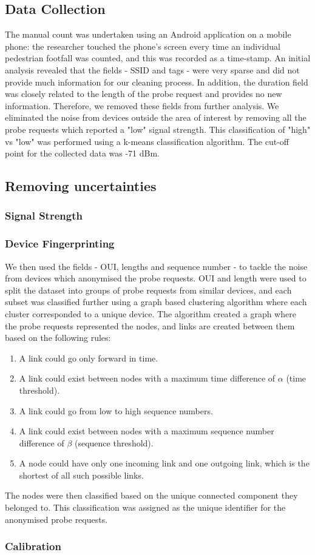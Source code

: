 \subsection{Data Collection}
The manual count was undertaken using an Android application on a mobile phone: the researcher touched the phone’s screen every time an individual pedestrian footfall was counted, and this was recorded as a time-stamp.
An initial analysis revealed that the fields - SSID and tags - were very sparse and did not provide much information for our cleaning process.
In addition, the duration field was closely related to the length of the probe request and provides no new information.
Therefore, we removed these fields from further analysis.
We eliminated the noise from devices outside the area of interest by removing all the probe requests which reported a "low" signal strength.
This classification of "high" vs "low" was performed using a k-means classification algorithm.
The cut-off point for the collected data was -71 dBm.
\subsection{Removing uncertainties}
\subsubsection{Signal Strength}
\lipsum[1-3]
\subsubsection{Device Fingerprinting}
We then used the fields - OUI, lengths and sequence number - to tackle the noise from devices which anonymised the probe requests.
OUI and length were used to split the dataset into groups of probe requests from similar devices, and each subset was classified further using a graph based clustering algorithm where each cluster corresponded to a unique device.
The algorithm created a graph where the probe requests represented the nodes, and links are created between them based on the following rules: 
	\begin{enumerate}
		\item A link could go only forward in time. 
		\item A link could exist between nodes with a maximum time difference of $\alpha$ (time threshold).
		\item A link could go from low to high sequence numbers.
		\item A link could exist between nodes with a maximum sequence number difference of $\beta$ (sequence threshold).
		\item A node could have only one incoming link and one outgoing link, which is the shortest of all such possible links.
	\end{enumerate}
The nodes were then classified based on the unique connected component they belonged to.
This classification was assigned as the unique identifier for the anonymised probe requests.
\subsubsection{Calibration}
\lipsum[1-2]
